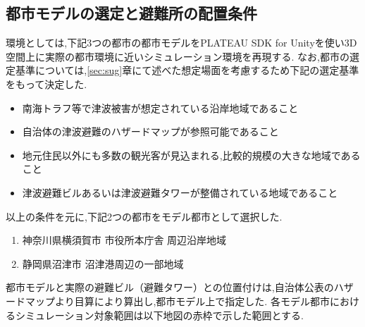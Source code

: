 \subsection{都市モデルの選定と避難所の配置条件}
環境としては,下記3つの都市の都市モデルをPLATEAU SDK for Unityを使い3D空間上に実際の都市環境に近いシミュレーション環境を再現する.
なお,都市の選定基準については,\ref{sec:sug}章にて述べた想定場面を考慮するため下記の選定基準をもって決定した.
\begin{itemize}
  \item 南海トラフ等で津波被害が想定されている沿岸地域であること
  \item 自治体の津波避難のハザードマップが参照可能であること
  \item 地元住民以外にも多数の観光客が見込まれる,比較的規模の大きな地域であること
  \item 津波避難ビルあるいは津波避難タワーが整備されている地域であること
\end{itemize}
以上の条件を元に,下記2つの都市をモデル都市として選択した.
\begin{enumerate}
  \item 神奈川県横須賀市 市役所本庁舎 周辺沿岸地域
  \item 静岡県沼津市 沼津港周辺の一部地域
\end{enumerate}
都市モデルと実際の避難ビル（避難タワー）との位置付けは,自治体公表のハザードマップより目算により算出し,都市モデル上で指定した.
各モデル都市におけるシミュレーション対象範囲は以下地図の赤枠で示した範囲とする.
